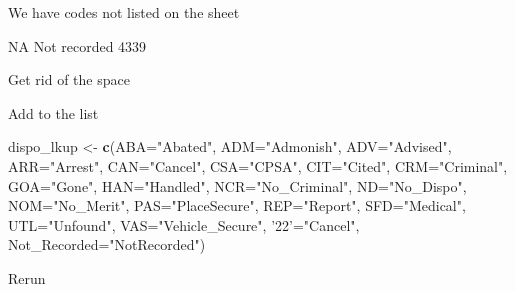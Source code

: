 \documentclass[]{book}
\newenvironment{Shaded}{\begin{snugshade}}{\end{snugshade}}
\newcommand{\DataTypeTok}[1]{\textcolor[rgb]{0.13,0.29,0.53}{#1}}
\newcommand{\KeywordTok}[1]{\textcolor[rgb]{0.13,0.29,0.53}{\textbf{#1}}}
\newcommand{\NormalTok}[1]{#1}
\newcommand{\OperatorTok}[1]{\textcolor[rgb]{0.81,0.36,0.00}{\textbf{#1}}}
\newcommand{\StringTok}[1]{\textcolor[rgb]{0.31,0.60,0.02}{#1}}
\begin{document}
We have codes not listed on the sheet

NA Not recorded 4339

Get rid of the space

\begin{Shaded}
\end{Shaded}

Add to the list

\begin{Shaded}
\begin{Highlighting}[]
\NormalTok{dispo_lkup <-}\StringTok{ }\KeywordTok{c}\NormalTok{(}\DataTypeTok{ABA=}\StringTok{"Abated"}\NormalTok{, }\DataTypeTok{ADM=}\StringTok{"Admonish"}\NormalTok{, }\DataTypeTok{ADV=}\StringTok{"Advised"}\NormalTok{, }\DataTypeTok{ARR=}\StringTok{"Arrest"}\NormalTok{, }\DataTypeTok{CAN=}\StringTok{"Cancel"}\NormalTok{, }\DataTypeTok{CSA=}\StringTok{"CPSA"}\NormalTok{, }
                \DataTypeTok{CIT=}\StringTok{"Cited"}\NormalTok{, }\DataTypeTok{CRM=}\StringTok{"Criminal"}\NormalTok{, }\DataTypeTok{GOA=}\StringTok{"Gone"}\NormalTok{, }\DataTypeTok{HAN=}\StringTok{"Handled"}\NormalTok{, }\DataTypeTok{NCR=}\StringTok{"No_Criminal"}\NormalTok{, }\DataTypeTok{ND=}\StringTok{"No_Dispo"}\NormalTok{, }
                \DataTypeTok{NOM=}\StringTok{"No_Merit"}\NormalTok{, }\DataTypeTok{PAS=}\StringTok{"PlaceSecure"}\NormalTok{, }\DataTypeTok{REP=}\StringTok{"Report"}\NormalTok{, }\DataTypeTok{SFD=}\StringTok{"Medical"}\NormalTok{, }\DataTypeTok{UTL=}\StringTok{"Unfound"}\NormalTok{, }
                \DataTypeTok{VAS=}\StringTok{"Vehicle_Secure"}\NormalTok{, }\StringTok{'22'}\NormalTok{=}\StringTok{"Cancel"}\NormalTok{, }\DataTypeTok{Not_Recorded=}\StringTok{"NotRecorded"}\NormalTok{)}
\end{Highlighting}
\end{Shaded}

Rerun

\hypertarget{section-1}{%
\chapter{}\label{section-1}}

\begin{Shaded}
\end{Shaded}
\end{document}
